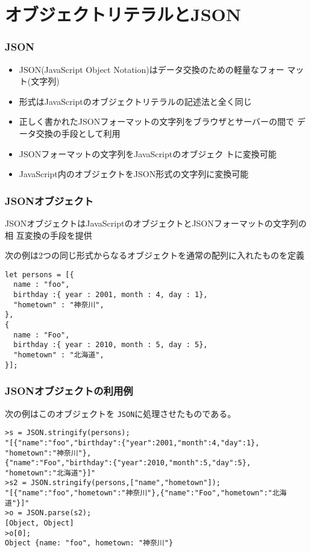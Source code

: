 \section{オブジェクトリテラルとJSON}
\begin{frame}[containsverbatim]
 \frametitle{JSON}
 \begin{itemize}
  \item JSON(JavaScript Object Notation)はデータ交換のための軽量なフォー
        マット(文字列)
  \item 形式はJavaScriptのオブジェクトリテラルの記述法と全く同じ
 \item 正しく書かれたJSONフォーマットの文字列をブラウザとサーバーの間で
       データ交換の手段として利用
 \item JSONフォーマットの文字列をJavaScriptのオブジェク
       トに変換可能
 \item JavaScript内のオブジェクトをJSON形式の文字列に変換可能
 \end{itemize}
\end{frame}
\begin{frame}[containsverbatim]
 \frametitle{JSONオブジェクト}
JSONオブジェクトはJavaScriptのオブジェクトとJSONフォーマットの文字列の相
 互変換の手段を提供

次の例は2つの同じ形式からなるオブジェクトを通常の配列に入れたものを定義
\begin{Verbatim}
let persons = [{
  name : "foo",
  birthday :{ year : 2001, month : 4, day : 1},
  "hometown" : "神奈川",
},
{
  name : "Foo",
  birthday :{ year : 2010, month : 5, day : 5},
  "hometown" : "北海道",
}];
\end{Verbatim}
 \end{frame}
\begin{frame}[containsverbatim]
 \frametitle{JSONオブジェクトの利用例}
 次の例はこのオブジェクトを \texttt{JSON}に処理させたものである。
 {\scriptsize
\begin{Verbatim}
>s = JSON.stringify(persons);
"[{"name":"foo","birthday":{"year":2001,"month":4,"day":1},
"hometown":"神奈川"},
{"name":"Foo","birthday":{"year":2010,"month":5,"day":5},
"hometown":"北海道"}]"
>s2 = JSON.stringify(persons,["name","hometown"]);
"[{"name":"foo","hometown":"神奈川"},{"name":"Foo","hometown":"北海道"}]"
>o = JSON.parse(s2);
[Object, Object]
>o[0];
Object {name: "foo", hometown: "神奈川"}
\end{Verbatim}
 }
\end{frame}
